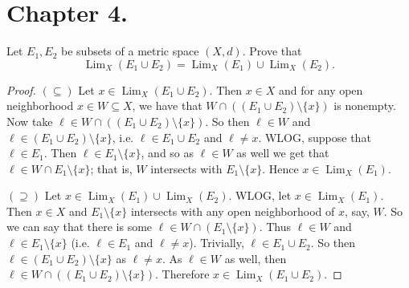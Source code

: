 \documentclass[10pt,reqno]{amsart}
\theoremstyle{definition}
\DeclareMathOperator{\Lim}{Lim}
\begin{document}
\section{Chapter 4.}

\begin{tcolorbox}[colback=black!5!white,colframe=black!75!black,title= Chapter 4: Exercise 1.1.] Let $E_1, E_2$ be subsets of a metric space $(X,d)$. Prove that
\[
\Lim_X(E_1 \cup E_2) = \Lim_X(E_1) \cup \Lim_X(E_2).
\]
\tcblower
\begin{proof} $(\subseteq)$ Let $x \in \Lim_X(E_1 \cup E_2)$. Then $x \in X$ and for any open neighborhood $x \in W \subseteq X$, we have that $W \cap ( (E_1 \cup E_2) \setminus \{x \} )$ is nonempty. Now take $\ell \in W \cap ( (E_1 \cup E_2) \setminus \{x \} )$. So then $\ell \in W$ and $\ell \in (E_1 \cup E_2) \setminus \{x \}$, i.e. $\ell \in E_1 \cup E_2$ and $\ell \neq x$. WLOG, suppose that $\ell \in E_1$. Then $\ell \in E_1 \setminus \{x \}$, and so as $\ell \in W$ as well we get that $\ell \in W \cap E_1 \setminus \{x \}$; that is, $W$ intersects with $E_1 \setminus \{x \}$. Hence $x \in \Lim_X(E_1)$.

$(\supseteq)$ Let $x \in \Lim_X(E_1) \cup \Lim_X(E_2)$. WLOG, let $x \in \Lim_X(E_1)$. Then $x \in X$ and $E_1 \setminus \{x \}$ intersects with any open neighborhood of $x$, say, $W$. So we can say that there is some $\ell \in W \cap (E_1 \setminus \{x \})$. Thus $\ell \in W$ and $\ell \in E_1 \setminus \{x \}$ (i.e. $\ell \in E_1 $ and $\ell \neq x$). Trivially, $\ell \in E_1 \cup E_2$. So then $\ell \in (E_1 \cup E_2) \setminus \{x \}$ as $\ell \neq x$. As $\ell \in W$ as well, then $\ell \in W \cap ( (E_1 \cup E_2) \setminus \{x \})$. Therefore $x \in \Lim_X(E_1 \cup E_2)$.
\end{proof}
\end{tcolorbox}
\end{document}
